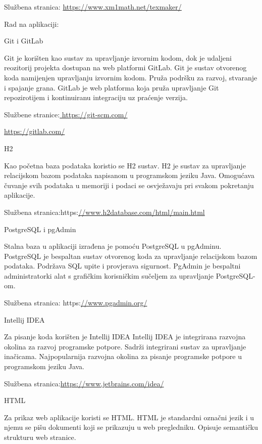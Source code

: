 Službena stranica: \url{https://www.xm1math.net/texmaker/}
\vspace{8mm}

Rad na aplikaciji:
\vspace{4mm}

Git i GitLab

Git je korišten kao sustav za upravljanje izvornim kodom, dok je udaljeni reozitorij projekta dostupan na web platformi GitLab.
Git je sustav otvorenog koda namijenjen upravljanju izvornim kodom. Pruža podršku za razvoj, stvaranje i spajanje grana.
GitLab je web platforma koja pruža upravljanje Git repozirotijem i kontinuiranu integraciju uz praćenje verzija. 

Službene stranice:\url{ https://git-scm.com/}

\url{https://gitlab.com/}
\vspace{3mm}

H2

Kao početna baza podataka koristio se H2 sustav.
H2 je sustav za upravljanje relacijskom bazom podataka napisanom u programskom jeziku Java. Omogućava čuvanje svih podataka u memoriji i podaci se osvježavaju pri svakom pokretanju aplikacije.

Službena stranica:https:\url{//www.h2database.com/html/main.html }
\vspace{3mm}

PostgreSQL i pgAdmin

Stalna baza u aplikaciji izrađena je pomoću PostgreSQL u pgAdminu.
PostgreSQL je bespaltan sustav otvorenog koda za upravljanje relacijskom bazom podataka. Podržava SQL upite i provjerava sigurnost.
PgAdmin je bespaltni administratorki alat s grafičkim korisničkim sučeljem za upravljanje PostgreSQL-om.

Službena stranica: https:\url{//www.pgadmin.org/}
\vspace{3mm}

Intellij IDEA

Za pisanje koda korišten je Intellij IDEA
Intellij IDEA je integrirana razvojna okolina za razvoj programske potpore. Sadrži integrirani sustav za upravljanje inačicama. Najpopularnija razvojna okolina za pisanje programske potpore u programskom jeziku Java.

Službena stranica:\url{https://www.jetbrains.com/idea/}
\vspace{3mm}


HTML

Za prikaz web aplikacije koristi se HTML. 
HTML je standardni označni jezik i u njemu se pišu dokumenti koji se prikazuju u web pregledniku. Opisuje semantičku strukturu web stranice.
\vspace{3mm}

